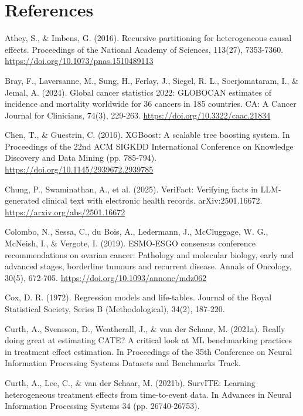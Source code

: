 \chapter*{References}

Athey, S., \& Imbens, G. (2016). Recursive partitioning for heterogeneous causal effects. Proceedings of the National Academy of Sciences, 113(27), 7353-7360. \href{https://www.pnas.org/doi/full/10.1073/pnas.1510489113}{https://doi.org/10.1073/pnas.1510489113}

Bray, F., Laversanne, M., Sung, H., Ferlay, J., Siegel, R. L., Soerjomataram, I., \& Jemal, A. (2024). Global cancer statistics 2022: GLOBOCAN estimates of incidence and mortality worldwide for 36 cancers in 185 countries. CA: A Cancer Journal for Clinicians, 74(3), 229-263. \href{https://acsjournals.onlinelibrary.wiley.com/doi/10.3322/caac.21834}{https://doi.org/10.3322/caac.21834}

Chen, T., \& Guestrin, C. (2016). XGBoost: A scalable tree boosting system. In Proceedings of the 22nd ACM SIGKDD International Conference on Knowledge Discovery and Data Mining (pp. 785-794). \href{https://dl.acm.org/doi/10.1145/2939672.2939785}{https://doi.org/10.1145/2939672.2939785}

Chung, P., Swaminathan, A., et al. (2025). VeriFact: Verifying facts in LLM-generated clinical text with electronic health records. arXiv:2501.16672. \href{https://arxiv.org/abs/2501.16672}{https://arxiv.org/abs/2501.16672}

Colombo, N., Sessa, C., du Bois, A., Ledermann, J., McCluggage, W. G., McNeish, I., \& Vergote, I. (2019). ESMO-ESGO consensus conference recommendations on ovarian cancer: Pathology and molecular biology, early and advanced stages, borderline tumours and recurrent disease. Annals of Oncology, 30(5), 672-705. \href{https://www.annalsofoncology.org/article/S0923-7534(19)31162-7/fulltext}{https://doi.org/10.1093/annonc/mdz062}

Cox, D. R. (1972). Regression models and life-tables. Journal of the Royal Statistical Society, Series B (Methodological), 34(2), 187-220.

Curth, A., Svensson, D., Weatherall, J., \& van der Schaar, M. (2021a). Really doing great at estimating CATE? A critical look at ML benchmarking practices in treatment effect estimation. In Proceedings of the 35th Conference on Neural Information Processing Systems Datasets and Benchmarks Track.

Curth, A., Lee, C., \& van der Schaar, M. (2021b). SurvITE: Learning heterogeneous treatment effects from time-to-event data. In Advances in Neural Information Processing Systems 34 (pp. 26740-26753).

